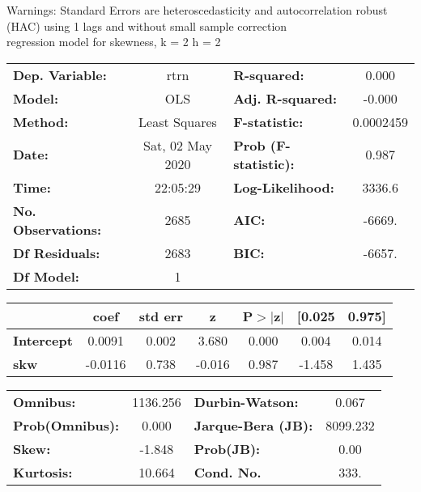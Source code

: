 Warnings: \newline
 [1] Standard Errors are heteroscedasticity and autocorrelation robust (HAC) using 1 lags and without small sample correction\\ 

regression model for skewness, k = 2 h = 2\begin{center}
\begin{tabular}{lclc}
\toprule
\textbf{Dep. Variable:}    &       rtrn       & \textbf{  R-squared:         } &     0.000   \\
\textbf{Model:}            &       OLS        & \textbf{  Adj. R-squared:    } &    -0.000   \\
\textbf{Method:}           &  Least Squares   & \textbf{  F-statistic:       } & 0.0002459   \\
\textbf{Date:}             & Sat, 02 May 2020 & \textbf{  Prob (F-statistic):} &    0.987    \\
\textbf{Time:}             &     22:05:29     & \textbf{  Log-Likelihood:    } &    3336.6   \\
\textbf{No. Observations:} &        2685      & \textbf{  AIC:               } &    -6669.   \\
\textbf{Df Residuals:}     &        2683      & \textbf{  BIC:               } &    -6657.   \\
\textbf{Df Model:}         &           1      & \textbf{                     } &             \\
\bottomrule
\end{tabular}
\begin{tabular}{lcccccc}
                   & \textbf{coef} & \textbf{std err} & \textbf{z} & \textbf{P$> |$z$|$} & \textbf{[0.025} & \textbf{0.975]}  \\
\midrule
\textbf{Intercept} &       0.0091  &        0.002     &     3.680  &         0.000        &        0.004    &        0.014     \\
\textbf{skw}       &      -0.0116  &        0.738     &    -0.016  &         0.987        &       -1.458    &        1.435     \\
\bottomrule
\end{tabular}
\begin{tabular}{lclc}
\textbf{Omnibus:}       & 1136.256 & \textbf{  Durbin-Watson:     } &    0.067  \\
\textbf{Prob(Omnibus):} &   0.000  & \textbf{  Jarque-Bera (JB):  } & 8099.232  \\
\textbf{Skew:}          &  -1.848  & \textbf{  Prob(JB):          } &     0.00  \\
\textbf{Kurtosis:}      &  10.664  & \textbf{  Cond. No.          } &     333.  \\
\bottomrule
\end{tabular}
\end{center}

